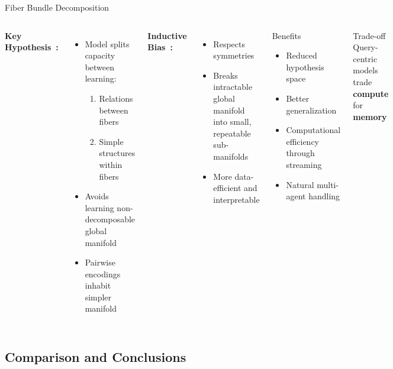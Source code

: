 \documentclass[10pt,aspectratio=169]{beamer}
\begin{document}
\begin{frame}{Fiber Bundle Decomposition}
\begin{columns}[T]
\textbf{Key Hypothesis~\cite{qcnetZhou2023}:}
\begin{itemize}
    \item Model splits capacity between learning:
    \begin{enumerate}
        \item Relations between fibers
        \item Simple structures within fibers
    \end{enumerate}
    \item Avoids learning non-decomposable global manifold
    \item Pairwise encodings inhabit simpler manifold
\end{itemize}

\textbf{Inductive Bias~\cite{qcnetZhou2023}:}
\begin{itemize}
    \item Respects symmetries
    \item Breaks intractable global manifold into small, repeatable sub-manifolds
    \item More data-efficient and interpretable
\end{itemize}

\begin{block}{Benefits}
\begin{itemize}
    \item Reduced hypothesis space
    \item Better generalization
    \item Computational efficiency through streaming
    \item Natural multi-agent handling
\end{itemize}
\end{block}

\begin{alertblock}{Trade-off}
Query-centric models trade \textbf{compute} for \textbf{memory}
\end{alertblock}
\end{columns}
\end{frame}

\subsection{Comparison and Conclusions}
\end{document}
